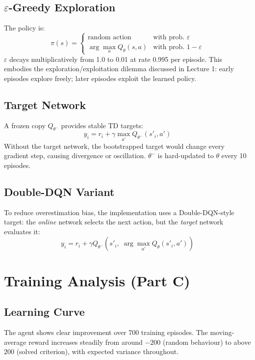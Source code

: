 \documentclass[11pt,a4paper]{article}
\begin{document}
\subsection{$\varepsilon$-Greedy Exploration}
The policy is:
\[
  \pi(s) =
  \begin{cases}
    \text{random action}         & \text{with prob.\ } \varepsilon \\
    \arg\max_a Q_\theta(s,a)     & \text{with prob.\ } 1-\varepsilon
  \end{cases}
\]
$\varepsilon$ decays multiplicatively from 1.0 to 0.01 at rate 0.995
per episode.  This embodies the exploration/exploitation dilemma
discussed in Lecture 1: early episodes explore freely; later episodes
exploit the learned policy.

\subsection{Target Network}
A frozen copy $Q_{\theta^-}$ provides stable TD targets:
\[
  y_i = r_i + \gamma \max_{a'} Q_{\theta^-}(s'_i,a')
\]
Without the target network, the bootstrapped target would change
every gradient step, causing divergence or oscillation.
$\theta^-$ is hard-updated to $\theta$ every 10 episodes.

\subsection{Double-DQN Variant}
To reduce overestimation bias, the implementation uses a
Double-DQN-style target: the \emph{online} network selects the next
action, but the \emph{target} network evaluates it:
\[
  y_i = r_i + \gamma Q_{\theta^-}\!\left(s'_i,\; \arg\max_{a'} Q_\theta(s'_i,a')\right)
\]

\section{Training Analysis (Part C)}

\subsection{Learning Curve}
The agent shows clear improvement over 700 training episodes.
The moving-average reward increases steadily from around $-200$
(random behaviour) to above $200$ (solved criterion), with
expected variance throughout.
\end{document}
